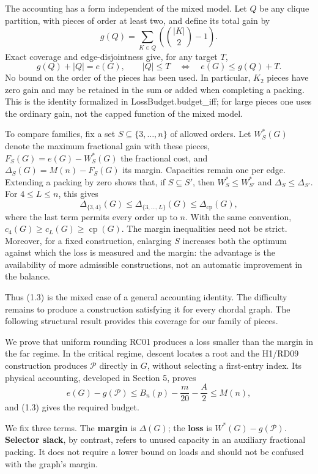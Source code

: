 \documentclass[english,11pt,a4paper]{article}
\begin{document}
The accounting has a form independent of the mixed model. Let \(Q\) be any clique partition, with pieces of order at least two, and define its total gain by \[
g(Q)=\sum_{K\in Q}\left(\binom{|K|}{2}-1\right).
\] Exact coverage and edge-disjointness give, for any target \(T\), \[
g(Q)+|Q|=e(G),\qquad
|Q|\le T\quad\Longleftrightarrow\quad e(G)\le g(Q)+T.
\tag{1.3a}
\] No bound on the order of the pieces has been used. In particular, \(K_2\) pieces have zero gain and may be retained in the sum or added when completing a packing. This is the identity formalized in {\ttfamily\small LossBudget.\discretionary{\hbox{\ensuremath{\hookrightarrow}}}{}{}budget\_\discretionary{\hbox{\ensuremath{\hookrightarrow}}}{}{}iff}; for large pieces one uses the ordinary gain, not the capped function of the mixed model.

To compare families, fix a set \(S\subseteq\{3,\ldots,n\}\) of allowed orders. Let \(W_S^*(G)\) denote the maximum fractional gain with these pieces, \(F_S(G)=e(G)-W_S^*(G)\) the fractional cost, and \(\Delta_S(G)=M(n)-F_S(G)\) its margin. Capacities remain one per edge. Extending a packing by zero shows that, if \(S\subseteq S'\), then \(W_S^*\le W_{S'}^*\) and \(\Delta_S\le\Delta_{S'}\). For \(4\le L\le n\), this gives \[
\Delta_{\{3,4\}}(G)\le\Delta_{\{3,\ldots,L\}}(G)
\le\Delta_{\mathrm{cp}}(G),
\tag{1.3b}
\] where the last term permits every order up to \(n\). With the same convention, \(c_4(G)\ge c_L(G)\ge\operatorname{cp}(G)\). The margin inequalities need not be strict. Moreover, for a fixed construction, enlarging \(S\) increases both the optimum against which the loss is measured and the margin: the advantage is the availability of more admissible constructions, not an automatic improvement in the balance.

Thus (1.3) is the mixed case of a general accounting identity. The difficulty remains to produce a construction satisfying it for every chordal graph. The following structural result provides this coverage for our family of pieces.

We prove that uniform rounding RC01 produces a loss smaller than the margin in the far regime. In the critical regime, descent locates a root and the H1/RD09 construction produces \(\mathcal P\) directly in \(G\), without selecting a first-entry index. Its physical accounting, developed in Section 5, proves \[
e(G)-g(\mathcal P)
\le B_n(p)-\frac m{20}-\frac A2
\le M(n),
\tag{1.4}
\] and (1.3) gives the required budget.

We fix three terms. The \textbf{margin} is \(\Delta(G)\); the \textbf{loss} is \(W^*(G)-g(\mathcal P)\). \textbf{Selector slack}, by contrast, refers to unused capacity in an auxiliary fractional packing. It does not require a lower bound on loads and should not be confused with the graph's margin.
\end{document}
